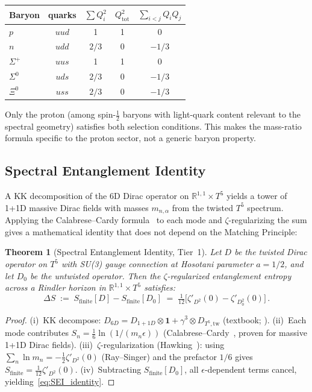 \documentclass[11pt,a4paper]{article}
\newtheorem{theorem}{Theorem}
\theoremstyle{definition}
\theoremstyle{remark}
\begin{document}
\begin{center}
\renewcommand{\arraystretch}{1.05}
\begin{tabular}{lcccc}
\toprule
Baryon & quarks & $\sum Q_i^2$ & $Q_{\mathrm{tot}}^2$ & $\sum_{i<j}Q_iQ_j$\\
\midrule
$p$ & $uud$ & 1 & 1 & 0\\
$n$ & $udd$ & $2/3$ & 0 & $-1/3$\\
$\Sigma^+$ & $uus$ & 1 & 1 & 0\\
$\Sigma^0$ & $uds$ & $2/3$ & 0 & $-1/3$\\
$\Xi^0$ & $uss$ & $2/3$ & 0 & $-1/3$\\
\bottomrule
\end{tabular}
\end{center}

\noindent Only the proton (among spin-$\frac12$ baryons with light-quark
content relevant to the spectral geometry) satisfies both selection
conditions.  This makes the mass-ratio formula specific to the
proton sector, not a generic baryon property.

\subsection{Spectral Entanglement Identity}
\label{sec:entanglement}

A KK decomposition of the 6D Dirac operator
on $\mathbb{R}^{1,1}\times T^5$ yields a tower of 1+1D massive Dirac
fields with masses $m_{n,\alpha}$ from the twisted $T^5$ spectrum.
Applying the Calabrese--Cardy formula~\cite{CalabreseCardy2004} to
each mode and $\zeta$-regularizing the sum gives a mathematical
identity that does not depend on the Matching Principle:

\begin{theorem}[Spectral Entanglement Identity, Tier~1]
\label{thm:entanglement}
Let $D$ be the twisted Dirac operator on $T^5$ with SU(3) gauge
connection at Hosotani parameter $a=1/2$, and let $D_0$ be the
untwisted operator.  Then the $\zeta$-regularized entanglement
entropy across a Rindler horizon in $\mathbb{R}^{1,1}\times T^5$
satisfies:
\begin{equation}\label{eq:SEI_identity}
  \Delta S
  \;:=\; S_{\mathrm{finite}}[D]-S_{\mathrm{finite}}[D_0]
  \;=\; \tfrac{1}{12}\bigl[\zeta'_{D^2}(0)-\zeta'_{D_0^2}(0)\bigr]\,.
\end{equation}
\end{theorem}

\begin{proof}
(i)~KK decompose: $D_{6D}=D_{1+1D}\otimes\mathbf{1}+\gamma^3\otimes
D_{T^5,\mathrm{tw}}$ (textbook; \cite{AppelquistChodosFreund1987}).
(ii)~Each mode contributes $S_n=\frac{1}{6}\ln(1/(m_n\epsilon))$
(Calabrese--Cardy~\cite{CalabreseCardy2004}, proven for massive
1+1D Dirac fields).
(iii)~$\zeta$-regularization (Hawking~\cite{Hawking1977}): using
$\sum_n\ln m_n = -\frac{1}{2}\zeta'_{D^2}(0)$ (Ray--Singer) and
the prefactor $1/6$ gives $S_{\mathrm{finite}}=\frac{1}{12}\zeta'_{D^2}(0)$.
(iv)~Subtracting $S_{\mathrm{finite}}[D_0]$, all
$\epsilon$-dependent terms cancel, yielding~\eqref{eq:SEI_identity}.
\end{proof}
\end{document}
